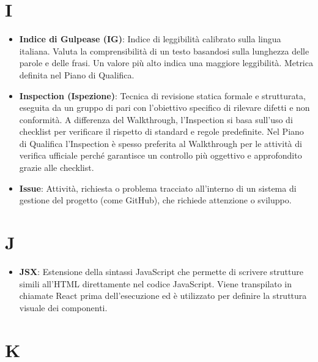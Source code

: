 \documentclass[11pt,a4paper]{article}
\begin{document}
\section*{I}
\begin{itemize}
\item \textbf{Indice di Gulpease (IG)}: Indice di leggibilità calibrato sulla lingua italiana. Valuta la comprensibilità di un testo basandosi sulla lunghezza delle parole e delle frasi. Un valore più alto indica una maggiore leggibilità. Metrica definita nel Piano di Qualifica.

\item \textbf{Inspection (Ispezione)}: Tecnica di revisione statica formale e strutturata, eseguita da un gruppo di pari con l'obiettivo specifico di rilevare difetti e non conformità. A differenza del Walkthrough, l'Inspection si basa sull'uso di checklist per verificare il rispetto di standard e regole predefinite. Nel Piano di Qualifica l'Inspection è spesso preferita al Walkthrough per le attività di verifica ufficiale perché garantisce un controllo più oggettivo e approfondito grazie alle checklist.

\item \textbf{Issue}: Attività, richiesta o problema tracciato all’interno di un sistema di gestione del progetto (come GitHub), che richiede attenzione o sviluppo.

\end{itemize}

\newpage

\section*{J}
\begin{itemize}
\item \textbf{JSX}: Estensione della sintassi JavaScript che permette 
di scrivere strutture simili all'HTML direttamente nel codice 
JavaScript. Viene transpilato in chiamate React prima dell'esecuzione 
ed è utilizzato per definire la struttura visuale dei componenti.
\end{itemize}

\newpage

\section*{K}

\newpage
\end{document}
